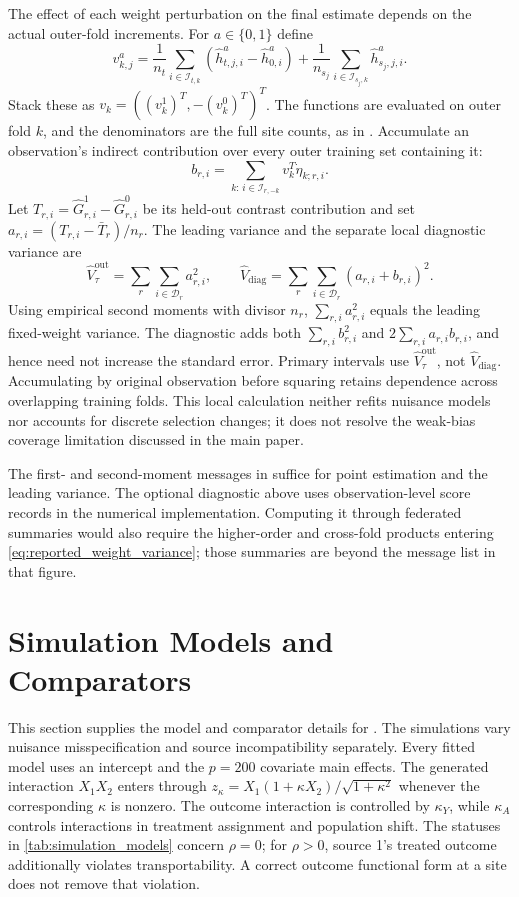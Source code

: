 \documentclass[12pt]{article}
\begin{document}
The effect of each weight perturbation on the final estimate depends on the actual outer-fold increments. For $a\in\{0,1\}$ define
\[
v_{k,j}^a=
\frac1{n_t}\sum_{i\in\mathcal I_{t,k}}
(\widehat h_{t,j,i}^a-\widehat h_{0,i}^a)
+\frac1{n_{s_j}}\sum_{i\in\mathcal I_{s_j,k}}\widehat h_{s_j,j,i}^a.
\]
Stack these as $v_k=((v_k^1)^T,-(v_k^0)^T)^T$. The functions are evaluated on outer fold $k$, and the denominators are the full site counts, as in . Accumulate an observation's indirect contribution over every outer training set containing it:
\[
b_{r,i}=\sum_{k:\,i\in\mathcal I_{r,-k}}v_k^T\dot\eta_{k;r,i}.
\]
Let $T_{r,i}=\widehat G_{r,i}^1-\widehat G_{r,i}^0$ be its held-out contrast contribution and set $a_{r,i}=(T_{r,i}-\bar T_r)/n_r$. The leading variance and the separate local diagnostic variance are
\begin{equation}\label{eq:reported_weight_variance}
\widehat V_\tau^{\mathrm{out}}=\sum_r\sum_{i\in\mathcal D_r}a_{r,i}^2,
\qquad
\widehat V_{\mathrm{diag}}=\sum_r\sum_{i\in\mathcal D_r}(a_{r,i}+b_{r,i})^2.
\end{equation}
Using empirical second moments with divisor $n_r$, $\sum_{r,i}a_{r,i}^2$ equals the leading fixed-weight variance. The diagnostic adds both $\sum_{r,i}b_{r,i}^2$ and $2\sum_{r,i}a_{r,i}b_{r,i}$, and hence need not increase the standard error. Primary intervals use $\widehat V_\tau^{\mathrm{out}}$, not $\widehat V_{\mathrm{diag}}$. Accumulating by original observation before squaring retains dependence across overlapping training folds. This local calculation neither refits nuisance models nor accounts for discrete selection changes; it does not resolve the weak-bias coverage limitation discussed in the main paper.

The first- and second-moment messages in  suffice for point estimation and the leading variance. The optional diagnostic above uses observation-level score records in the numerical implementation. Computing it through federated summaries would also require the higher-order and cross-fold products entering \cref{eq:reported_weight_variance}; those summaries are beyond the message list in that figure.

\section{Simulation Models and Comparators}\label{supp:simulation_details}
This section supplies the model and comparator details for . The simulations vary nuisance misspecification and source incompatibility separately. Every fitted model uses an intercept and the $p=200$ covariate main effects. The generated interaction $X_1X_2$ enters through $z_\kappa=X_1(1+\kappa X_2)/\sqrt{1+\kappa^2}$ whenever the corresponding $\kappa$ is nonzero. The outcome interaction is controlled by $\kappa_Y$, while $\kappa_A$ controls interactions in treatment assignment and population shift. The statuses in \cref{tab:simulation_models} concern $\rho=0$; for $\rho>0$, source 1's treated outcome additionally violates transportability. A correct outcome functional form at a site does not remove that violation.
\end{document}
